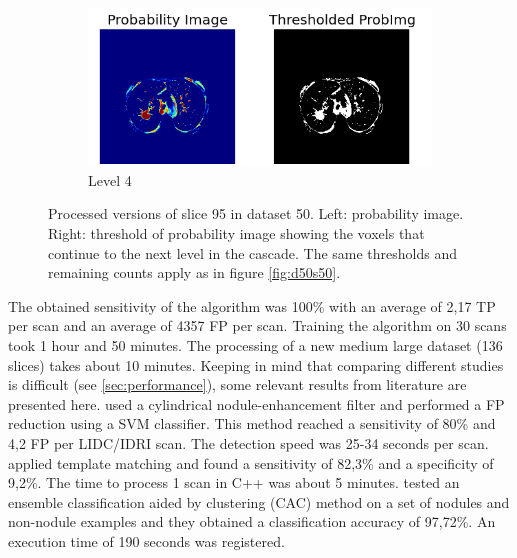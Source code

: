 \begin{figure}[p]
\begin{center}
\begin{subfigure}[b]{\linewidth}
		\includegraphics[width=\linewidth]{img/cascades/D50L4S95.png}
		\caption{Level 4}
	\end{subfigure}
  \caption{Processed versions of slice 95 in dataset 50. Left: probability
  image. Right: threshold of probability image showing the voxels that continue
  to the next level in the cascade. The same thresholds and remaining counts
  apply as in figure \ref{fig:d50s50}.}
  \label{fig:d50s95}
\end{center}
\end{figure}

The obtained sensitivity of the algorithm was 100\% with an average of 2,17 TP
per scan and an average of 4357 FP per scan. Training the algorithm on 30 scans
took 1 hour and 50 minutes. The processing of a new medium large dataset (136
slices) takes about 10 minutes.
Keeping in mind that comparing different studies is difficult (see
\ref{sec:performance}), some relevant results from literature are presented
here. \cite{teramoto} used a cylindrical nodule-enhancement filter and performed
a FP reduction using a SVM classifier. This method reached a sensitivity of 80\%
and 4,2 FP per LIDC/IDRI scan. The detection speed was 25-34 seconds per scan.
\cite{elbaz} applied template matching and found a sensitivity of 82,3\% and a
specificity of 9,2\%. The time to process 1 scan in C++ was about 5 minutes.
\cite{lee2010} tested an ensemble classification aided by clustering (CAC)
method on a set of nodules and non-nodule examples and they obtained a
classification accuracy of 97,72\%. An execution time of 190 seconds was
registered.

